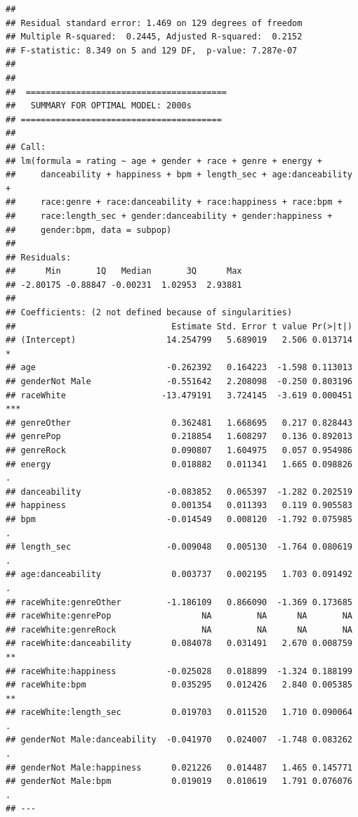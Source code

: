 \documentclass[
]{article}
\begin{document}
\begin{verbatim}
## 
## Residual standard error: 1.469 on 129 degrees of freedom
## Multiple R-squared:  0.2445, Adjusted R-squared:  0.2152 
## F-statistic: 8.349 on 5 and 129 DF,  p-value: 7.287e-07
## 
## 
##  ======================================== 
##   SUMMARY FOR OPTIMAL MODEL: 2000s 
## ======================================== 
## 
## Call:
## lm(formula = rating ~ age + gender + race + genre + energy + 
##     danceability + happiness + bpm + length_sec + age:danceability + 
##     race:genre + race:danceability + race:happiness + race:bpm + 
##     race:length_sec + gender:danceability + gender:happiness + 
##     gender:bpm, data = subpop)
## 
## Residuals:
##      Min       1Q   Median       3Q      Max 
## -2.80175 -0.88847 -0.00231  1.02953  2.93881 
## 
## Coefficients: (2 not defined because of singularities)
##                               Estimate Std. Error t value Pr(>|t|)    
## (Intercept)                  14.254799   5.689019   2.506 0.013714 *  
## age                          -0.262392   0.164223  -1.598 0.113013    
## genderNot Male               -0.551642   2.208098  -0.250 0.803196    
## raceWhite                   -13.479191   3.724145  -3.619 0.000451 ***
## genreOther                    0.362481   1.668695   0.217 0.828443    
## genrePop                      0.218854   1.608297   0.136 0.892013    
## genreRock                     0.090807   1.604975   0.057 0.954986    
## energy                        0.018882   0.011341   1.665 0.098826 .  
## danceability                 -0.083852   0.065397  -1.282 0.202519    
## happiness                     0.001354   0.011393   0.119 0.905583    
## bpm                          -0.014549   0.008120  -1.792 0.075985 .  
## length_sec                   -0.009048   0.005130  -1.764 0.080619 .  
## age:danceability              0.003737   0.002195   1.703 0.091492 .  
## raceWhite:genreOther         -1.186109   0.866090  -1.369 0.173685    
## raceWhite:genrePop                  NA         NA      NA       NA    
## raceWhite:genreRock                 NA         NA      NA       NA    
## raceWhite:danceability        0.084078   0.031491   2.670 0.008759 ** 
## raceWhite:happiness          -0.025028   0.018899  -1.324 0.188199    
## raceWhite:bpm                 0.035295   0.012426   2.840 0.005385 ** 
## raceWhite:length_sec          0.019703   0.011520   1.710 0.090064 .  
## genderNot Male:danceability  -0.041970   0.024007  -1.748 0.083262 .  
## genderNot Male:happiness      0.021226   0.014487   1.465 0.145771    
## genderNot Male:bpm            0.019019   0.010619   1.791 0.076076 .  
## ---

\end{verbatim}
\end{document}
